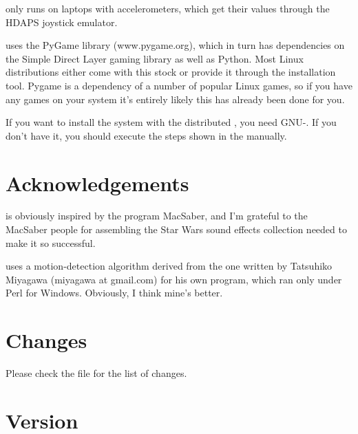 \documentclass[english]{article}
\begin{document}
\begin{description}\setlength{\itemsep}{0cm}
\item[An IBM or Lenovo Thinkpad with HDAPS]  only
  runs on laptops with accelerometers, which get their values through
  the HDAPS joystick emulator.

\item[PyGame]  uses the PyGame library
  (www.pygame.org), which in turn has dependencies on the Simple
  Direct Layer gaming library as well as Python.  Most Linux
  distributions either come with this stock or provide it through the
  installation tool.  Pygame is a dependency of a number of popular
  Linux games, so if you have any games on your system it's entirely
  likely this has already been done for you.

\item[Make] If you want to install the system with the distributed
     , you need GNU-. If you don't have it, you
     should execute the steps shown in the  manually.

\end{description}

\section{Acknowledgements}

 is obviously inspired by the program MacSaber, and I'm
grateful to the MacSaber people for assembling the Star Wars sound
effects collection needed to make it so successful.

 uses a motion-detection algorithm derived from the
one written by Tatsuhiko Miyagawa (miyagawa at gmail.com) for his own
 program, which ran only under Perl for Windows.
Obviously, I think mine's better.

\section{Changes}
{\small}
Please check the file  for the list of changes.

\section{Version}
\end{document}
